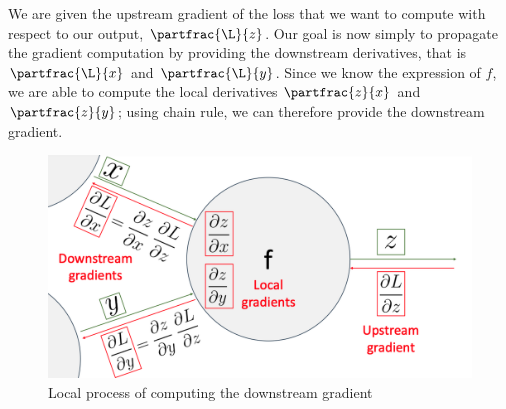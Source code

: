 We are given the upstream gradient of the loss that we want to compute with respect to our output, $\partfrac{\L}{z}$. Our goal is now simply to propagate the gradient computation by providing the downstream derivatives, that is $\partfrac{\L}{x}$ and $\partfrac{\L}{y}$. Since we know the expression of $f$, we are able to compute the local derivatives $\partfrac{z}{x}$ and $\partfrac{z}{y}$; using chain rule, we can therefore provide the downstream gradient.
\begin{figure}[H]
    \centering
    \includegraphics[width=.6\textwidth]{images/modularity.png}
    \caption{Local process of computing the downstream gradient}
\end{figure}